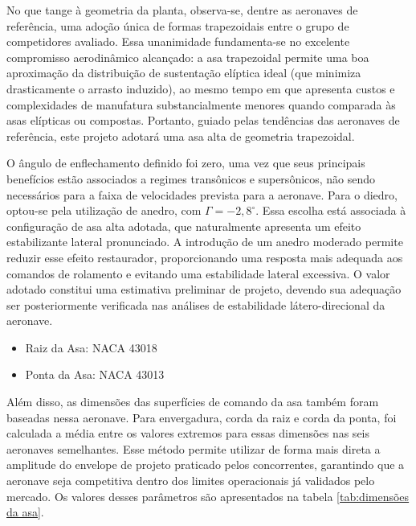 No que tange à geometria da planta, observa-se, dentre as aeronaves de referência, uma adoção única de formas trapezoidais entre o grupo de competidores avaliado. Essa unanimidade fundamenta-se no excelente compromisso aerodinâmico alcançado: a asa trapezoidal permite uma boa aproximação da distribuição de sustentação elíptica ideal (que minimiza drasticamente o arrasto induzido), ao mesmo tempo em que apresenta custos e complexidades de manufatura substancialmente menores quando comparada às asas elípticas ou compostas. Portanto, guiado pelas tendências das aeronaves de referência, este projeto adotará uma asa alta de geometria trapezoidal.

O ângulo de enflechamento definido foi zero, uma vez que seus principais benefícios estão associados a regimes transônicos e supersônicos, não sendo necessários para a faixa de velocidades prevista para a aeronave. Para o diedro, optou-se pela utilização de anedro, com \(\Gamma=-2,8^\circ\). Essa escolha está associada à configuração de asa alta adotada, que naturalmente apresenta um efeito estabilizante lateral pronunciado. A introdução de um anedro moderado permite reduzir esse efeito restaurador, proporcionando uma resposta mais adequada aos comandos de rolamento e evitando uma estabilidade lateral excessiva. O valor adotado constitui uma estimativa preliminar de projeto, devendo sua adequação ser posteriormente verificada nas análises de estabilidade látero-direcional da aeronave.

\begin{itemize}
    \item Raiz da Asa: NACA 43018
    \item Ponta da Asa: NACA 43013

\end{itemize}

Além disso, as dimensões das superfícies de comando da asa também foram baseadas nessa aeronave. Para envergadura, corda da raiz e corda da ponta, foi calculada a média entre os valores extremos para essas dimensões nas seis aeronaves semelhantes. Esse método permite utilizar de forma mais direta a amplitude do envelope de projeto praticado pelos concorrentes, garantindo que a aeronave seja competitiva dentro dos limites operacionais já validados pelo mercado. Os valores desses parâmetros são apresentados na tabela \ref{tab:dimensões da asa}.

